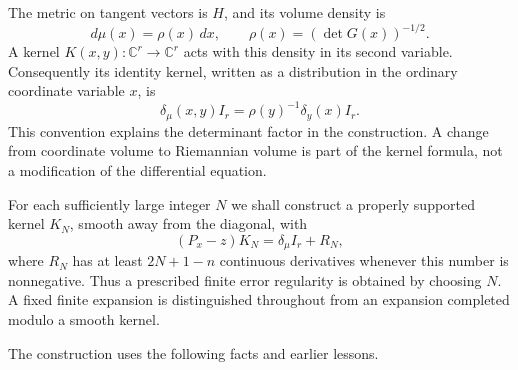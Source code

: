 \documentclass[
  11pt,
]{article}
\begin{document}
The metric on tangent vectors is \(H\), and its volume density is \[
                   d\mu(x)=\rho(x)\,dx,
 \qquad \rho(x)=(\det G(x))^{-1/2}.                            \tag{H3}
\] A kernel \(K(x,y):\mathbb C^r\to\mathbb C^r\) acts with this density
in its second variable. Consequently its identity kernel, written as a
distribution in the ordinary coordinate variable \(x\), is \[
              \delta_\mu(x,y)I_r
                  =\rho(y)^{-1}\delta_y(x)I_r.                \tag{H4}
\] This convention explains the determinant factor in the construction.
A change from coordinate volume to Riemannian volume is part of the
kernel formula, not a modification of the differential equation.

For each sufficiently large integer \(N\) we shall construct a properly
supported kernel \(K_N\), smooth away from the diagonal, with \[
                    (P_x-z)K_N=\delta_\mu I_r+R_N,             \tag{H5}
\] where \(R_N\) has at least \(2N+1-n\) continuous derivatives whenever
this number is nonnegative. Thus a prescribed finite error regularity is
obtained by choosing \(N\). A fixed finite expansion is distinguished
throughout from an expansion completed modulo a smooth kernel.

The construction uses the following facts and earlier lessons.
\end{document}
